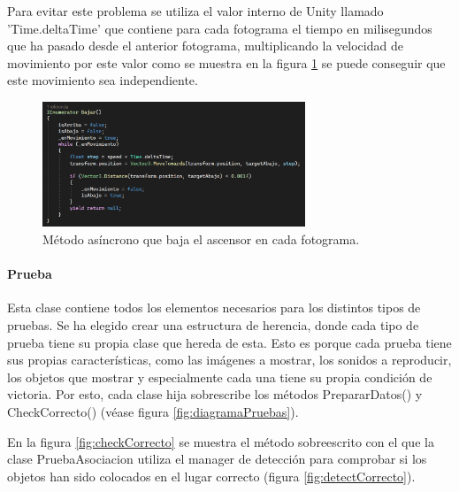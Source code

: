 Para evitar este problema se utiliza el valor interno de Unity llamado 'Time.deltaTime' que contiene para cada fotograma el tiempo en milisegundos que ha pasado desde el anterior fotograma, multiplicando la velocidad de movimiento por este valor como se muestra en la figura \ref{fig:ascensorBajar} se puede conseguir que este movimiento sea independiente. 

\begin{figure}
	\centering
	\includegraphics[width=0.7\textwidth]{04.Desarrollo/05.Entrega5/01.Iteracion5_1/00.Figuras/17.ascensor_bajar.png}
	\caption{Método asíncrono que baja el ascensor en cada fotograma.}
	\label{fig:ascensorBajar}
\end{figure}



\paragraph{Prueba}
Esta clase contiene todos los elementos necesarios para los distintos tipos de pruebas. Se ha elegido crear una estructura de herencia, donde cada tipo de prueba tiene su propia clase que hereda de esta. Esto es porque cada prueba tiene sus propias características, como las imágenes a mostrar, los sonidos a reproducir, los objetos que mostrar y especialmente cada una tiene su propia condición de victoria. Por esto, cada clase hija sobrescribe los métodos PrepararDatos() y CheckCorrecto() (véase figura \ref{fig:diagramaPruebas}).

En la figura \ref{fig:checkCorrecto} se muestra el método sobreescrito con el que la clase PruebaAsociacion utiliza el manager de detección para comprobar si los objetos han sido colocados en el lugar correcto (figura \ref{fig:detectCorrecto}).


